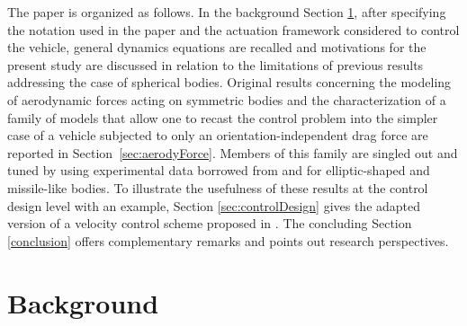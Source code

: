 \documentclass[twocolumn]{autart}
\theoremstyle{definition}
\theoremstyle{definition}
\begin{document}
The paper is organized as follows. In the background Section \ref{sec:background}, after specifying the notation used in the paper and the actuation framework considered to control the vehicle, general dynamics equations are recalled and motivations for the present study are discussed in relation to the limitations of previous results addressing the case of spherical bodies.
Original results concerning the modeling of aerodynamic forces acting on symmetric bodies and the characterization of a family of models that allow one to recast the control problem into the simpler case of a vehicle subjected to only an orientation-independent drag force are reported in Section~\ref{sec:aerodyForce}. Members of this family are singled out and tuned by using experimental data borrowed from \cite{1965_WAYNE}  and \cite{1971_SAFFEL} for elliptic-shaped and missile-like bodies.
To illustrate the usefulness of these results at the control design level with an example, Section \ref{sec:controlDesign} gives the adapted version of a velocity control scheme proposed in \cite{2009_HUA}. The concluding Section \ref{conclusion} offers complementary remarks and points out research perspectives.

\section{Background}
\label{sec:background}
\end{document}
